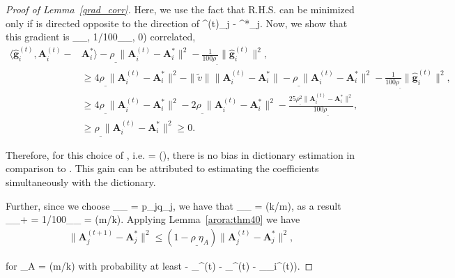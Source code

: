 \documentclass{article}
\newcommand{\HT}{{\c{T}}}
\newcommand{\gradvec}{\b{g}_i}
\def\[#1\]{{$#1$}}
\def\b#1{{\mathbf{#1}}}
\def\c#1{{\mathcal{#1}}}
\begin{document}
\begin{proof}[Proof of Lemma~\ref{grad_corr}]
				Here, we use the fact that R.H.S. can be minimized only if \[\tilde{v}\] is directed opposite to the direction of \[\b{A}^{(t)}_j - \b{A}^*_j\]. Now, we show that this gradient is \[(\rho_{\_}, 1/100\rho_{\_}, 0)\] correlated,
				\begin{align*}
				\langle\hat{\b{g}}^{(t)}_i, \b{A}^{(t)}_i - &\b{A}^*_i\rangle - \rho_{\_} \|\b{A}^{(t)}_i - \b{A}^*_i\|^2 - \tfrac{1}{100\rho_{\_}}\|\hat{\b{g}}^{(t)}_i\|^2, \\
				&\geq 4\rho_{\_} \|\b{A}^{(t)}_i - \b{A}^*_i\|^2 - \|\tilde{v}\| \|\b{A}^{(t)}_i - \b{A}^*_i\|  - \rho_{\_} \|\b{A}^{(t)}_i - \b{A}^*_i\|^2 - \tfrac{1}{100\rho_{\_}}\|\hat{\b{g}}^{(t)}_i\|^2, \\
				&\geq 4\rho_{\_} \|\b{A}^{(t)}_i - \b{A}^*_i\|^2 - 2\rho_{\_} \|\b{A}^{(t)}_i - \b{A}^*_i\|^2 -\tfrac{25\rho_{\_}^2 \|\b{A}^{(t)}_i - \b{A}^*_i\|^2}{100\rho_{\_}},\\
				&\geq \rho_{\_} \|\b{A}^{(t)}_i - \b{A}^*_i\|^2  \geq 0.
				\end{align*}
				
			Therefore, for this choice of \[k\], i.e.  \[k = \c{O} ()\], there is no bias in dictionary estimation in comparison to \cite{Arora15}. This gain can be attributed to estimating the coefficients simultaneously with the dictionary.
			
			Further, since we choose \[4\rho_{\_} = p_jq_j\], we have that \[\rho_{\_} = \Theta(k/m)\], as a result \[\rho_{_+} = 1/100\rho_{\_} = \Omega(m/k)\]. Applying Lemma~\ref{arora:thm40} we have 
				\begin{align*}
				\|\b{A}^{(t+1)}_j- \b{A}^*_j\|^2 \leq (1 - \rho_{\_}\eta_A)\|\b{A}^{(t)}_j- \b{A}^*_j\|^2,
				\end{align*}
				
				for \[\eta_A = (m/k)\] with probability at least \[(1 - \delta_{\HT}^{(t)} - \delta_{\beta}^{(t)} - \delta_{\gradvec}^{(t)})\].








































\end{proof}
\end{document}
